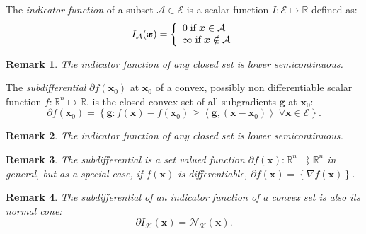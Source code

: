 \documentclass[AMA,STIX1COL]{WileyNJD-v2}
\newcommand{\vect}[1]{\bm{#1}}
\newtheorem*{remark*}{Remark}
\begin{document}
\begin{definition}
The \textit{indicator function} of a subset $\mathcal{A} \in \mathcal{E}$ is a scalar function $I: \mathcal{E} \mapsto \mathbb{R}$
defined as:
\begin{equation}
\label{eq:indicator}
{I}_{\mathcal{A}}(\vect{x}) = 
\left\{ 
\begin{array}[pos]{l}
0     \;  \text{if} \; \vect{x} \in \mathcal{A} \\
\infty   \; \text{if} \; \vect{x} \notin \mathcal{A}
\end{array}
\right.
\end{equation}
\end{definition}

\begin{remark*}
The indicator function of any closed set is lower semicontinuous.
\end{remark*}


\begin{definition}
The \textit{subdifferential} $\partial f(\vect{x}_0)$ at $\vect{x}_0$ of a convex, possibly non differentiable scalar function $f: \mathbb{R}^n \mapsto \mathbb{R}$, is the closed convex set of all subgradients $\vect{g}$ at $\vect{x}_0$:
\begin{equation}
\label{eq:subdifferential}
\partial f(\vect{x}_0) = \left\{ \vect{g} : 
  f(\vect{x}) -  f(\vect{x}_0) \geq \left\langle \vect{g}, (\vect{x} - \vect{x}_0) \right\rangle \; \forall \vect{x} \in \mathcal{E} \right\}.
\end{equation}
\end{definition}

\begin{remark*}
The indicator function of any closed set is lower semicontinuous.
\end{remark*}

\begin{remark*}
The subdifferential is a set valued function $\partial f(\vect{x}): \mathbb{R}^n \rightrightarrows \mathbb{R}^n$ in general, but as a special case, if $f(\vect{x})$ is differentiable, $\partial f(\vect{x}) = \left\{ \nabla f(\vect{x}) \right\}$.
\end{remark*}

\begin{remark*}
The subdifferential of an indicator function of a convex set is also its normal cone:
%
\begin{equation}
\label{eq:sub_ind}
\partial {I}_{\mathcal{K}}(\vect{x}) = \mathcal{N}_{\mathcal{K}}(\vect{x}).
\end{equation}
\end{remark*}
\end{document}
